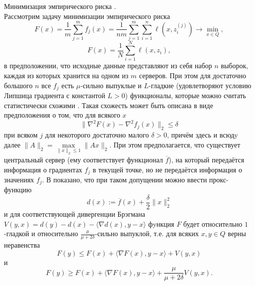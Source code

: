     \begin{example}{Минимизация эмпирического риска \cite{Hendr}.}\label{min_risk}\\
        Рассмотрим задачу минимизации эмпирического риска
        \begin{equation}\label{EmpirProbl}
            F(x)=\frac{1}{m} \sum_{j=1}^{m} f_{j}(x)=\frac{1}{n m} \sum_{j=1}^{m} \sum_{i=1}^{n} \ell\left(x, z_{i}^{(j)}\right)
            \rightarrow\min\limits_{x\in Q},
        \end{equation}
        \begin{equation}
            F(x)=\frac{1}{N}\sum\limits_{i=1}^N \ell(x,z_i),
        \end{equation}
        в предположении, что исходные данные представляют из себя набор $n$ выборок, каждая из которых хранится на одном из $m$ серверов. При этом для достаточно большого $n$ все $f_j$ есть $\mu$-сильно выпуклые и $L$-гладкие (удовлетворяют условию Липшица градиента с константой $L > 0$) функционалы, которые можно считать статистически схожими \cite{Hendr}. Такая схожесть может быть описана в виде предположения \cite{Hendr} о том, что для всякого $x$
        $$
            \|\nabla^2 F(x) - \nabla^2 f_j (x)\|_2 \leq \delta
        $$
        при всяком $j$ для некоторого достаточно малого $\delta >0$, причём здесь и всюдy далее $\|A\|_2 = \max\limits_{\|x\|_2 \leq 1}\|Ax\|_2$. При этом предполагается, что существует центральный сервер (ему соответствует функционал $\overline{f}$), на который передаётся информация о градиентах $f_j$ в текущей точке, но не передаётся информация о значениях $f_j$. В \cite{Hendr} показано, что при таком допущении можно ввести прокс-функцию
        \begin{equation}\label{prox_risk}
            d(x):= \overline{f}(x) + \frac{\delta}{2}\|x\|_2^2 
        \end{equation}
        и для соответствующей дивергенции Брэгмана $V(y, x) = d(y) - d(x) - \langle \nabla d(x), y -x \rangle$ фyнкция $F$ будет относительно $1$-гладкой и относительно $\frac{\mu}{\mu + 2\delta}$-сильно выпуклой, т.е. для всяких $x, y \in Q$ верны неравенства
        $$
            F(y) \leq F(x) + \langle \nabla F(x), y - x\rangle + V(y, x)
        $$
        и
        $$
            F(y) \geq F(x) + \langle \nabla F(x), y - x\rangle + \frac{\mu}{\mu + 2\delta} V(y, x).
        $$
            

\end{example}
